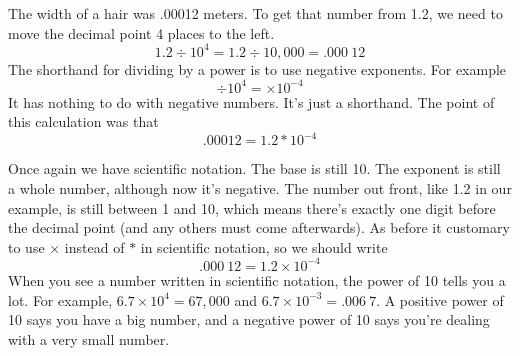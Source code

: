 The width of a hair was .00012 meters.  To get that number from 1.2, we need to move the decimal point 4 places to the left.  $$1.2 \div 10^4 = 1.2 \div 10,000 = .000~12$$
The shorthand for dividing by a power is to use negative exponents.  For example
$$ \div 10^4 = \times 10^{-4}$$
It has nothing to do with negative numbers.  It's just a shorthand.
The point of this calculation was that $$.00012= 1.2\ast10^{-4}$$

Once again we have scientific notation.  The base is still 10.  The exponent is still a whole number, although now it's negative.  The number out front, like 1.2 in our example, is still between 1 and 10, which means there's exactly one digit before the decimal point (and any others must come afterwards).  As before it customary to use $\times$ instead of $\ast$ in scientific notation, so we should write
$$.000~12= 1.2 \times 10^{-4}$$
When you see a number written in scientific notation, the power of 10 tells you a lot.  For example, $6.7 \times 10^4 = 67,000$ and $6.7 \times 10^{-3} = .006~7$.  A positive power of 10 says you have a big number, and a negative power of 10 says you're dealing with a very small number.  

 